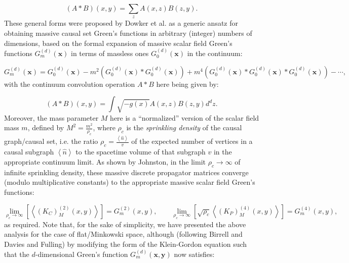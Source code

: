 \documentclass{article}
\begin{document}
\begin{equation}
\left( A * B \right) \left( x, y \right) = \sum_{z} A \left( x, z \right) B \left( z, y \right).
\end{equation}
These general forms were proposed by Dowker et al.\cite{dowker2} as a generic ansatz for obtaining massive causal set Green's functions in arbitrary (integer) numbers of dimensions, based on the formal expansion of massive scalar field Green's functions ${G_{m}^{\left( d \right)} \left( \mathbf{x} \right)}$ in terms of massless ones ${G_{0}^{\left( d \right)} \left( \mathbf{x} \right)}$ in the continuum:

\begin{equation}
G_{m}^{\left( d \right)} \left( \mathbf{x} \right) = G_{0}^{\left( d \right)} \left( \mathbf{x} \right) - m^2 \left( G_{0}^{\left( d \right)} \left( \mathbf{x} \right) * G_{0}^{\left( d \right)} \left( \mathbf{x} \right) \right) + m^4 \left( G_{0}^{\left( d \right)} \left( \mathbf{x} \right) * G_{0}^{\left( d \right)} \left( \mathbf{x} \right) * G_{0}^{\left( d \right)} \left( \mathbf{x} \right) \right) - \cdots,
\end{equation}
with the continuum convolution operation ${A * B}$ here being given by:

\begin{equation}
\left( A * B \right) \left( x, y \right) = \int \sqrt{-g \left( x \right)} A \left( x,z \right) B \left( z, y \right) d^d z.
\end{equation}
Moreover, the mass parameter $M$ here is a ``normalized'' version of the scalar field mass $m$, defined by ${M^2 = \frac{m^2}{\rho_c}}$, where ${\rho_c}$ is the \textit{sprinkling density} of the causal graph/causal set, i.e. the ratio ${\rho_c = \frac{\left\langle \hat{n} \right\rangle}{v}}$ of the expected number of vertices in a causal subgraph ${\left\langle \hat{n} \right\rangle}$ to the spacetime volume of that subgraph $v$ in the appropriate continuum limit. As shown by Johnston\cite{johnston}\cite{johnston2}, in the limit ${\rho_c \to \infty}$ of infinite sprinkling density, these massive discrete propagator matrices converge (modulo multiplicative constants) to the appropriate massive scalar field Green's functions:

\begin{equation}
\lim_{\rho_c \to \infty} \left[ \left\langle \left( K_C \right)_{M}^{\left( 2 \right)} \left( x, y \right) \right\rangle \right] = G_{m}^{\left( 2 \right)} \left( x, y \right), \qquad \lim_{\rho_c \to \infty} \left[ \sqrt{\rho_c} \left\langle \left( K_P \right)_{M}^{\left( 4 \right)} \left( x, y \right) \right\rangle \right] = G_{m}^{\left( 4 \right)} \left( x, y \right),
\end{equation}
as required. Note that, for the sake of simplicity, we have presented the above analysis for the case of flat/Minkowski space, although (following Birrell and Davies\cite{birrell} and Fulling\cite{fulling}) by modifying the form of the Klein-Gordon equation such that the $d$-dimensional Green's function ${G_{m}^{\left( d \right)} \left( \mathbf{x}, \mathbf{y} \right)}$ now satisfies:
\end{document}

